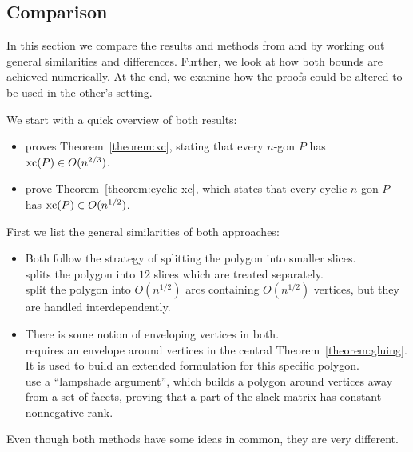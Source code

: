 \subsection{Comparison}

In this section we compare the results and methods from \textcite{shitov2020sublinear} and \textcite{kwan2020extension} by working out general similarities and differences. Further, we look at how both bounds are achieved numerically. At the end, we examine how the proofs could be altered to be used in the other's setting.

We start with a quick overview of both results:

\begin{itemize}
  \item \textcite{shitov2020sublinear} proves Theorem~\ref{theorem:xc}, stating that every $n$-gon $P$ has $\operatorname{xc}(P) \in O(n^{2/3})$.
  \item \textcite{kwan2020extension} prove Theorem~\ref{theorem:cyclic-xc}, which states that every cyclic $n$-gon $P$ has $\operatorname{xc}(P) \in O(n^{1/2})$.
\end{itemize}

First we list the general similarities of both approaches:

\begin{itemize}
  \item Both follow the strategy of splitting the polygon into smaller slices.\\
        \citeauthor{shitov2020sublinear} splits the polygon into $12$ slices which are treated separately.\\
        \citeauthor{kwan2020extension} split the polygon into $O(n^{1/2})$ arcs containing $O(n^{1/2})$ vertices, but they are handled interdependently.
  \item There is some notion of enveloping vertices in both.\\
        \citeauthor{shitov2020sublinear} requires an envelope around vertices in the central Theorem~\ref{theorem:gluing}. It is used to build an extended formulation for this specific polygon.\\
        \citeauthor{kwan2020extension} use a ``lampshade argument'', which builds a polygon around vertices away from a set of facets, proving that a part of the slack matrix has constant nonnegative rank.
\end{itemize}

Even though both methods have some ideas in common, they are very different.

